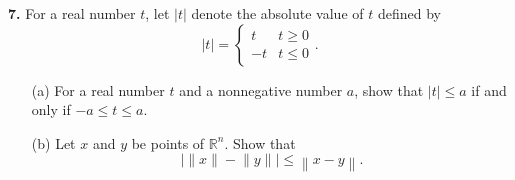 \documentclass[12pt]{article}
\newcommand{\norm}[1]{\left\lVert#1\right\rVert}
\begin{document}
\medskip

\noindent \textbf{7.} For a real number $t$, let $|t|$ denote the absolute value of $t$ defined by  
\[
|t| = \begin{cases}
t & t \geqslant 0 \\
-t & t \leqslant 0
\end{cases}.
\] 
\begin{enumerate}
\item[(a)] For a real number $t$ and a nonnegative number $a$, show that $|t|\leqslant a$ if and only if $-a \leqslant t \leqslant a$. 
\item[(b)] Let $x$ and $y$ be points of $\mathbb{R}^n$. Show that 
\[
\big\lvert\lVert{x}\rVert - \lVert{y}\rVert\big\rvert \leqslant \norm{x -y}. 
\]
\end{enumerate}
\end{document}

